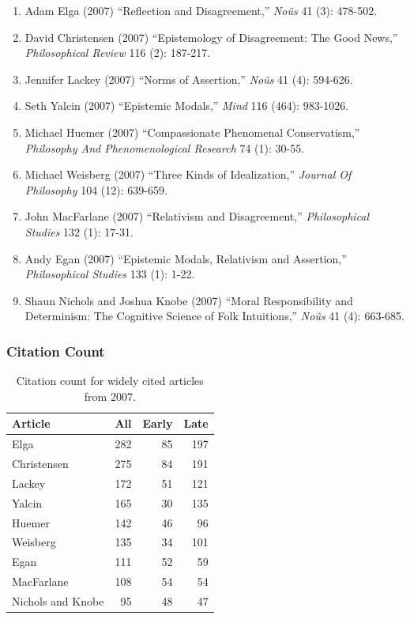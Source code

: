 \documentclass[
  10pt,
  letterpaper,
  DIV=11,
  numbers=noendperiod,
  twoside]{scrartcl}
\providecommand{\tightlist}{%
  \setlength{\itemsep}{0pt}\setlength{\parskip}{0pt}}\usepackage{longtable,booktabs,array}
\begin{document}
\begin{enumerate}
\def\labelenumi{\arabic{enumi}.}
\tightlist
\item
  Adam Elga (2007) ``Reflection and Disagreement,'' \emph{Noûs} 41 (3):
  478-502.
\item
  David Christensen (2007) ``Epistemology of Disagreement: The Good
  News,'' \emph{Philosophical Review} 116 (2): 187-217.
\item
  Jennifer Lackey (2007) ``Norms of Assertion,'' \emph{Noûs} 41 (4):
  594-626.
\item
  Seth Yalcin (2007) ``Epistemic Modals,'' \emph{Mind} 116 (464):
  983-1026.
\item
  Michael Huemer (2007) ``Compassionate Phenomenal Conservatism,''
  \emph{Philosophy And Phenomenological Research} 74 (1): 30-55.
\item
  Michael Weisberg (2007) ``Three Kinds of Idealization,'' \emph{Journal
  Of Philosophy} 104 (12): 639-659.
\item
  John MacFarlane (2007) ``Relativism and Disagreement,''
  \emph{Philosophical Studies} 132 (1): 17-31.
\item
  Andy Egan (2007) ``Epistemic Modals, Relativism and Assertion,''
  \emph{Philosophical Studies} 133 (1): 1-22.
\item
  Shaun Nichols and Joshua Knobe (2007) ``Moral Responsibility and
  Determinism: The Cognitive Science of Folk Intuitions,'' \emph{Noûs}
  41 (4): 663-685.
\end{enumerate}

\subsubsection*{Citation Count}\label{sec-count-2007}

\begin{longtable}[]{@{}lrrr@{}}

\caption{\label{tbl-citation-count-2007}Citation count for widely cited
articles from 2007.}

\tabularnewline

\toprule\noalign{}
Article & All & Early & Late \\
\midrule\noalign{}
\endhead
\bottomrule\noalign{}
\endlastfoot
Elga & 282 & 85 & 197 \\
Christensen & 275 & 84 & 191 \\
Lackey & 172 & 51 & 121 \\
Yalcin & 165 & 30 & 135 \\
Huemer & 142 & 46 & 96 \\
Weisberg & 135 & 34 & 101 \\
Egan & 111 & 52 & 59 \\
MacFarlane & 108 & 54 & 54 \\
Nichols and Knobe & 95 & 48 & 47 \\

\end{longtable}
\end{document}
